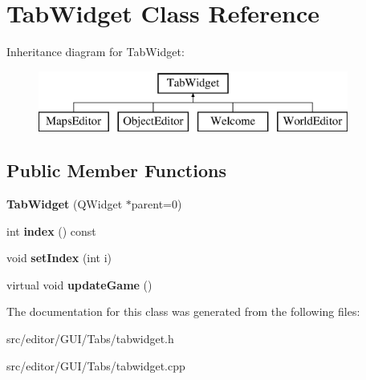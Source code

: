 \hypertarget{class_tab_widget}{\section{\-Tab\-Widget \-Class \-Reference}
\label{class_tab_widget}
}
\-Inheritance diagram for \-Tab\-Widget\-:\begin{figure}[H]
\begin{center}
\leavevmode
\includegraphics[height=2.000000cm]{class_tab_widget}
\end{center}
\end{figure}
\subsection*{\-Public \-Member \-Functions}
\begin{DoxyCompactItemize}
\item 
\hypertarget{class_tab_widget_a5aad386a078e6085d72e5ade6c4a678d}{{\bfseries \-Tab\-Widget} (\-Q\-Widget $\ast$parent=0)}\label{class_tab_widget_a5aad386a078e6085d72e5ade6c4a678d}

\item 
\hypertarget{class_tab_widget_a98e3d1229d031db9584aee4e32f704ba}{int {\bfseries index} () const }\label{class_tab_widget_a98e3d1229d031db9584aee4e32f704ba}

\item 
\hypertarget{class_tab_widget_a39b94d30a678d6e9c93669888bfb8de3}{void {\bfseries set\-Index} (int i)}\label{class_tab_widget_a39b94d30a678d6e9c93669888bfb8de3}

\item 
\hypertarget{class_tab_widget_a2272e79554d0cb0aa69da95d7b4cc0b3}{virtual void {\bfseries update\-Game} ()}\label{class_tab_widget_a2272e79554d0cb0aa69da95d7b4cc0b3}

\end{DoxyCompactItemize}


\-The documentation for this class was generated from the following files\-:\begin{DoxyCompactItemize}
\item 
src/editor/\-G\-U\-I/\-Tabs/tabwidget.\-h\item 
src/editor/\-G\-U\-I/\-Tabs/tabwidget.\-cpp\end{DoxyCompactItemize}
